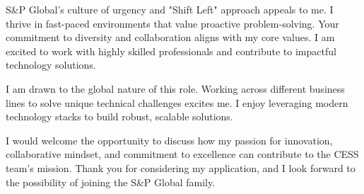 \documentclass[10pt, letterpaper]{article}
\begin{document}
\vspace{8pt}

S\&P Global's culture of urgency and "Shift Left" approach appeals to me. I thrive in fast-paced environments that value proactive problem-solving. Your commitment to diversity and collaboration aligns with my core values. I am excited to work with highly skilled professionals and contribute to impactful technology solutions.

\vspace{8pt}

I am drawn to the global nature of this role. Working across different business lines to solve unique technical challenges excites me. I enjoy leveraging modern technology stacks to build robust, scalable solutions.

\vspace{8pt}

I would welcome the opportunity to discuss how my passion for innovation, collaborative mindset, and commitment to excellence can contribute to the CESS team's mission. Thank you for considering my application, and I look forward to the possibility of joining the S\&P Global family.

\vspace{10pt}


\end{document}
